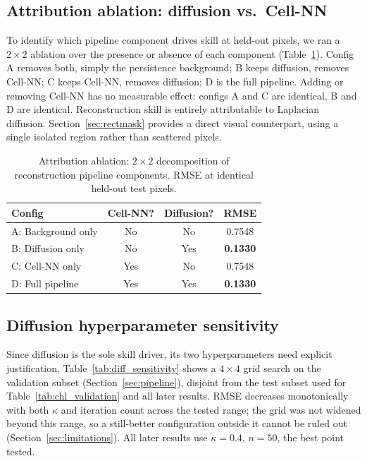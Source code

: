 \documentclass[final,5p,times,twocolumn,authoryear]{elsarticle}
\begin{document}
\subsection{Attribution ablation: diffusion vs.\ Cell-NN}
\label{sec:attribution}

To identify which pipeline component drives skill at held-out
pixels, we ran a $2\times2$ ablation over the presence or absence of
each component (Table~\ref{tab:attribution}). Config A removes both,
simply the persistence background; B keeps diffusion, removes
Cell-NN; C keeps Cell-NN, removes diffusion; D is the full pipeline.
Adding or removing Cell-NN has no measurable effect: configs A and C
are identical, B and D are identical. Reconstruction skill is
entirely attributable to Laplacian diffusion.
Section~\ref{sec:rectmask} provides a direct visual counterpart,
using a single isolated region rather than scattered pixels.

\begin{table}[t]
\centering
\small
\caption{Attribution ablation: $2\times2$ decomposition of reconstruction
pipeline components. RMSE at identical held-out test pixels.}
\label{tab:attribution}
\begin{tabular}{lccc}
\toprule
Config & Cell-NN? & Diffusion? & RMSE \\
\midrule
A: Background only & No  & No  & 0.7548 \\
B: Diffusion only  & No  & Yes & \textbf{0.1330} \\
C: Cell-NN only    & Yes & No  & 0.7548 \\
D: Full pipeline   & Yes & Yes & \textbf{0.1330} \\
\bottomrule
\end{tabular}
\end{table}

\subsection{Diffusion hyperparameter sensitivity}
\label{sec:diffsens}

Since diffusion is the sole skill driver, its two hyperparameters
need explicit justification. Table~\ref{tab:diff_sensitivity} shows a
$4\times4$ grid search on the validation subset
(Section~\ref{sec:pipeline}), disjoint from the test subset used for
Table~\ref{tab:chl_validation} and all later results. RMSE decreases
monotonically with both $\kappa$ and iteration count across the
tested range; the grid was not widened beyond this range, so a
still-better configuration outside it cannot be ruled out
(Section~\ref{sec:limitations}). All later results use $\kappa=0.4$,
$n=50$, the best point tested.
\end{document}
